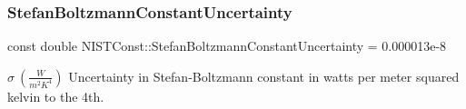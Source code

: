 \subsubsection{\texorpdfstring{Stefan\+Boltzmann\+Constant\+Uncertainty}{StefanBoltzmannConstantUncertainty}}
{\footnotesize\ttfamily const double N\+I\+S\+T\+Const\+::\+Stefan\+Boltzmann\+Constant\+Uncertainty = 0.\+000013e-\/8}

$\sigma \ (\frac{W}{m^2 K^4})$ Uncertainty in Stefan-\/\+Boltzmann constant in watts per meter squared kelvin to the 4th. 